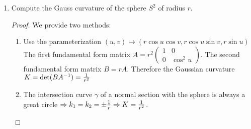 \documentclass{article}
\DeclarePairedDelimiter\abs{\lvert}{\rvert}
\DeclarePairedDelimiter\norm{\lVert}{\rVert}
\def\v#1{\overrightarrow{#1}}
\begin{document}
\begin{enumerate}
\begin{enumerate}[label=(\arabic*)]
\item Prove that a surface $\Sigma$ is part of a sphere if and only if its second fundamental form $\Pi_p$ is a non-zero-constant multiple of its first fundamental form $I_p$, i.e. $\Pi_p = c I_p$ for some real number $c$ and each $p\in \Sigma$.
\end{enumerate}
\begin{proof}\mbox{}
\begin{enumerate}[label=(\arabic*)]
\item $\Rightarrow:$ the second partial derivative of $\sigma$ with respect to $u,v$ is zero, therefore the second fundamental form is zero.

$\Leftarrow: $ $\v{n} = \sigma_u \times \sigma_v$, We know that $\sigma_u \cdot \v{n} = 0 \Rightarrow \sigma_{uu} \cdot \v{n} + \sigma_{u} \cdot \v{n}_u =0$. Since $L=\sigma_{uu}\cdot \v{n}=0$, we have $ \sigma_{u} \cdot \v{n}_u =0$. 
Also $\sigma_{uv} \cdot \v{n} + \sigma_{u} \cdot \v{n}_v =0 \Rightarrow \sigma_v \cdot \v{n}_u = 0$. 
From $\v{n}\cdot \v{n} = 1 \Rightarrow \v{n}\cdot \v{n}_u = 0 $. While $\v{n},\sigma_u,\sigma_v$ is an orthogonal basis of $\mathbb{R}^3$, $\v{n}_u=0$. By the same deduction, $\v{n}_v=0$. Then $\v{n}$ is a constant unit vector and integrate $\sigma_u\cdot \v{n}=0$ gives $\sigma \cdot \v{n}=c$, which is the equation of a plane in $\mathbb{R}^3$.
\item $\Rightarrow:$ See the next problem solution for detail.

$\Leftarrow:$ We know that $\binom{\v{n}_u}{\v{n}_v} = -BA^{-1} \binom{\sigma_u}{\sigma_v}$. Since $B=c A$, $\v{n}_u=-c \sigma_u, \v{n}_v = -c \sigma_v \Rightarrow \v{n} + c\sigma = a \Rightarrow \norm{\sigma-{a \over c}} = \abs{{1\over c}}$. That is, $\Sigma$ is part of a sphere.
\end{enumerate}
\end{proof}
\item Compute the Gauss curvature of the sphere $S^2$ of radius $r$.
\begin{proof}
We provide two methods:
\begin{enumerate}
\item Use the parameterization $(u,v)\longmapsto (r\cos u \cos v,r\cos u \sin v,r\sin u)$
The first fundamental form matrix $A = r^2 \begin{pmatrix} 1 & 0 \\ 0 & \cos^2 u \end{pmatrix}$.
The second fundamental form matrix $B = r A$.
Therefore the Gaussian curvature $K=\det(BA^{-1})={1 \over r^2}$
\item The intersection curve $\gamma $ of a normal section with the sphere is always a great circle $\Rightarrow k_1 =k_2 =\pm {1\over r} \Rightarrow K= {1\over r^2}$. 
\end{enumerate}
\end{proof}
\end{enumerate}
\end{document}
